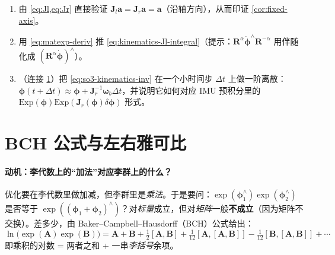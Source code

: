 \begin{practice}
\begin{enumerate}
  \item 由 \cref{eq:Jl,eq:Jr} 直接验证 $\mathbf{J}_l\mathbf{a}=\mathbf{J}_r\mathbf{a}=\mathbf{a}$（沿轴方向），从而印证 \cref{cor:fixed-axis}。
  \item 用 \cref{eq:matexp-deriv} 推 \cref{eq:kinematics-Jl-integral}（提示：$\mathbf{R}^\alpha\dot{\boldsymbol{\phi}}^\wedge\mathbf{R}^{-\alpha}$ 用伴随化成 $(\mathbf{R}^\alpha\dot{\boldsymbol{\phi}})^\wedge$）。
  \item （连接 \cref{sec:bch}）把 \cref{eq:so3-kinematics-inv} 在一个小时间步 $\Delta t$ 上做一阶离散：$\boldsymbol{\phi}(t+\Delta t)\approx\boldsymbol{\phi}+\mathbf{J}_r^{-1}\boldsymbol{\omega}_b\Delta t$，并说明它如何对应 IMU 预积分里的 $\mathrm{Exp}(\boldsymbol{\phi})\mathrm{Exp}(\mathbf{J}_r(\boldsymbol{\phi})\delta\boldsymbol{\phi})$ 形式。
\end{enumerate}
\end{practice}

\section{BCH 公式与左右雅可比}
\label{sec:bch}

\paragraph{动机：李代数上的“加法”对应李群上的什么？}
优化要在李代数里做加减，但李群里是\emph{乘法}。于是要问：$\exp(\boldsymbol{\phi}_1^\wedge)\exp(\boldsymbol{\phi}_2^\wedge)$ 是否等于 $\exp((\boldsymbol{\phi}_1+\boldsymbol{\phi}_2)^\wedge)$？对\emph{标量}成立，但对\emph{矩阵}一般\textbf{不成立}（因为矩阵不交换）。差多少，由 Baker–Campbell–Hausdorff（BCH）公式给出：
\begin{equation}
  \ln\big(\exp(\mathbf{A})\exp(\mathbf{B})\big)=\mathbf{A}+\mathbf{B}+\tfrac12[\mathbf{A},\mathbf{B}]+\tfrac1{12}[\mathbf{A},[\mathbf{A},\mathbf{B}]]-\tfrac1{12}[\mathbf{B},[\mathbf{A},\mathbf{B}]]+\cdots
  \label{eq:bch}
\end{equation}
即乘积的对数 = 两者之和 + 一串\emph{李括号}余项。

